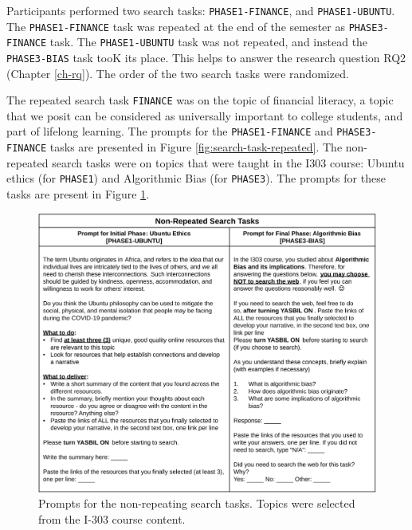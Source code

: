 \documentclass[letterpaper, nobind]{templates/ociamthesis}
\begin{document}
Participants performed two search tasks: \texttt{PHASE1-FINANCE}, and \texttt{PHASE1-UBUNTU}.
The \texttt{PHASE1-FINANCE} task was repeated at the end of the semester as \texttt{PHASE3-FINANCE} task.
The \texttt{PHASE1-UBUNTU} task was not repeated, and instead the \texttt{PHASE3-BIAS} task tooK its place.
This helps to answer the research question RQ2 (Chapter \ref{ch-rq}).
The order of the two search tasks were randomized.

The repeated search task \texttt{FINANCE} was on the topic of financial literacy, a topic that we posit can be considered as universally important to college students, and part of lifelong learning.
The prompts for the \texttt{PHASE1-FINANCE} and \texttt{PHASE3-FINANCE} tasks are presented in Figure \ref{fig:search-task-repeated}.
The non-repeated search tasks were on topics that were taught in the I303 course:
Ubuntu ethics (for \texttt{PHASE1})
and
Algorithmic Bias (for \texttt{PHASE3}).
The prompts for these tasks are present in Figure \ref{fig:search-task-new}.

\begin{figure}

{\centering \includegraphics[width=1\linewidth]{figs/search-task-new} 

}

\caption[Prompts for non-repeated search task.]{Prompts for the non-repeating search tasks. Topics were selected from the I-303 course content.}\label{fig:search-task-new}
\end{figure}
\end{document}
